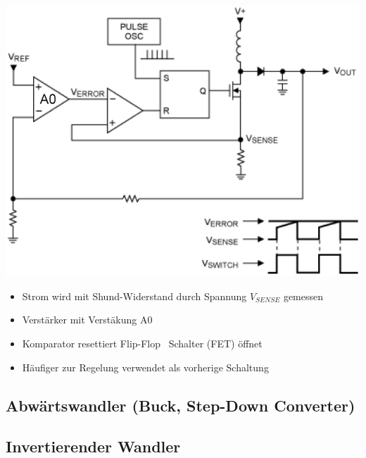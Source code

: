 \begin{minipage}{0.42\columnwidth}
    \includegraphics[width=\columnwidth]{images/regelung_ausgangsspannung_current.png}
\end{minipage}
\hfill
\begin{minipage}{0.56\columnwidth}
    \begin{itemize}
        \item Strom wird mit Shund-Widerstand durch Spannung $V_{SENSE}$ gemessen
        \item Verstärker mit Verstäkung A0
        \item Komparator resettiert Flip-Flop \textrightarrow\ Schalter (FET) öffnet
        \item Häufiger zur Regelung verwendet als vorherige Schaltung
    \end{itemize}
\end{minipage}


\subsection{Abwärtswandler (Buck, Step-Down Converter)}

\begin{minipage}[c]{0.4\columnwidth}
    
\end{minipage}
\hfill
\begin{minipage}[c]{0.58\columnwidth}
    
\end{minipage}


\subsection{Invertierender Wandler}

